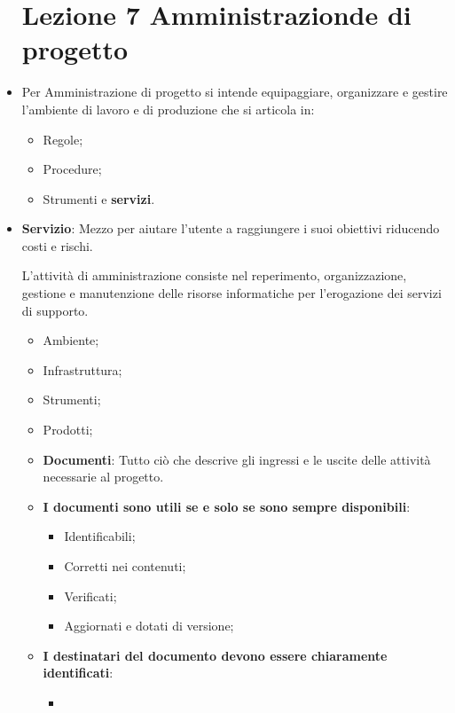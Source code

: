 \documentclass[a4paper,10pt] {article}
\begin{document}
\begin{itemize}
\begin{itemize}
	
\end{itemize}


\section{Lezione 7 Amministrazionde di progetto}

	\item Per Amministrazione di progetto si intende equipaggiare, organizzare 
	e gestire l'ambiente di lavoro e di produzione che si articola in:
		\begin{itemize}
			\item Regole;
			\item Procedure;
			\item Strumenti e \textbf{servizi}.
		\end{itemize} 
	\item \textbf{Servizio}: Mezzo per aiutare l'utente a raggiungere i suoi 
	obiettivi riducendo costi e rischi.
	
	L'attività di amministrazione consiste nel reperimento, organizzazione, 
	gestione e manutenzione delle risorse informatiche per l'erogazione dei 
	servizi di supporto.
		\begin{itemize}
			\item Ambiente;
			\item Infrastruttura;
			\item Strumenti;
			\item Prodotti;
			\item \textbf{Documenti}: Tutto ciò che descrive gli ingressi e le 
			uscite delle attività necessarie al progetto.
			\item \textbf{I documenti sono utili se e solo se sono sempre 
			disponibili}:
				\begin{itemize}
					\item Identificabili;
					\item Corretti nei contenuti;
					\item Verificati;
					\item Aggiornati e dotati di versione;
				\end{itemize}
			\item \textbf{I destinatari del documento devono essere chiaramente 
			identificati}:
				\begin{itemize}
					\item 
				\end{itemize}
		\end{itemize}
	
	



\end{itemize}
\end{document}
